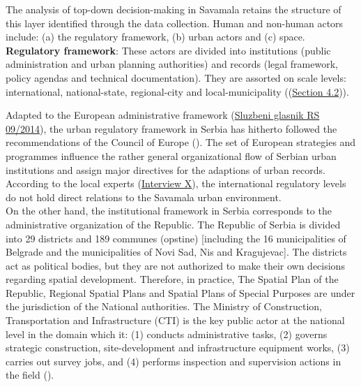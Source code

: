 \documentclass[11pt]{report}
\begin{document}
{{{{\begin{itemize}
The analysis of top-down decision-making in Savamala retains the structure of this layer identified through the data collection.
Human and non-human actors include:
(a) the regulatory framework,
(b) urban actors
and
(c) space.
\\

\textbf{Regulatory framework}: 
These actors are divided into institutions (public administration and urban planning authorities) and records (legal framework, policy agendas and technical documentation).
They are assorted on scale levels: international, national-state, regional-city and local-municipality ((\href{Section 4.2}{Section 4.2})). 

Adapted to the European administrative framework (\href{Sluzbeni glasnik}{Sluzbeni glasnik RS 09/2014}), the urban regulatory framework in Serbia has hitherto followed the recommendations of the Council of Europe 
(\href{ref}{\citealt{ministarstvo_prostora_urbani_2014}}). The set of European strategies and programmes influence the rather general organizational flow of Serbian urban institutions and assign major directives for the adaptions of urban records. 
According to the local experts
(\href{InterviewX}{Interview X}),
the international regulatory levels do not hold direct relations to the Savamala urban environment.
\\

On the other hand, the institutional framework in Serbia corresponds to the administrative organization of the Republic. The Republic of Serbia is divided into 29 districts and 189 communes (opstine) [including the 16 municipalities of Belgrade and the  municipalities of Novi Sad, Nis and Kragujevac]. The districts act as political bodies, but they are not authorized to make their own decisions regarding spatial development. Therefore, in practice, The Spatial Plan of the Republic, Regional Spatial Plans and Spatial Plans of Special Purposes are under the jurisdiction of the National authorities. The Ministry of Construction, Transportation and Infrastructure (CTI) is the key public actor at the national level in the domain which it: (1) conducts administrative tasks, (2) governs strategic construction, site-development and infrastructure equipment works, (3) carries out survey jobs, and (4) performs inspection and supervision actions in the field (\href{Maksic}{\citealt{maksic_european_2012}}).
\\


\end{itemize}}}}}
\end{document}
